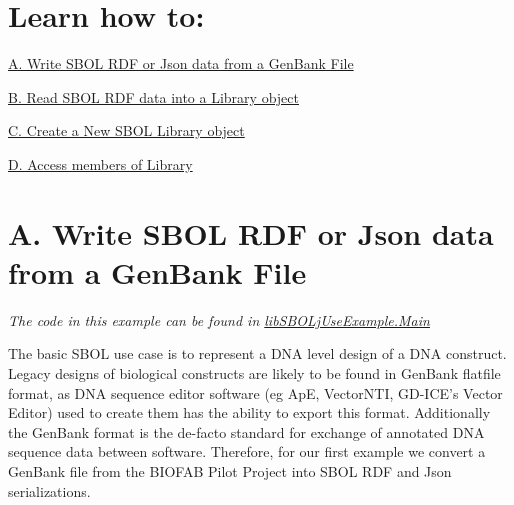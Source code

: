 \hypertarget{tutorial_sec_toc}{}\section{Learn how to:}\label{tutorial_sec_toc}
\hyperlink{tutorial_A}{A. Write SBOL RDF or Json data from a GenBank File} \par
 \hyperlink{tutorial_B}{B. Read SBOL RDF data into a Library object} \par
 \hyperlink{tutorial_C}{C. Create a New SBOL Library object} \par
 \hyperlink{tutorial_D}{D. Access members of Library} \par




 \hypertarget{tutorial_A}{}\section{A. Write SBOL RDF or Json data from a GenBank File}\label{tutorial_A}
{\itshape The code in this example can be found in \hyperlink{classlib_s_b_o_lj_use_example_1_1_main}{libSBOLjUseExample.Main}\/}

The basic SBOL use case is to represent a DNA level design of a DNA construct. Legacy designs of biological constructs are likely to be found in GenBank flatfile format, as DNA sequence editor software (eg ApE, VectorNTI, GD-\/ICE's Vector Editor) used to create them has the ability to export this format. Additionally the GenBank format is the de-\/facto standard for exchange of annotated DNA sequence data between software. Therefore, for our first example we convert a GenBank file from the BIOFAB Pilot Project into SBOL RDF and Json serializations.


